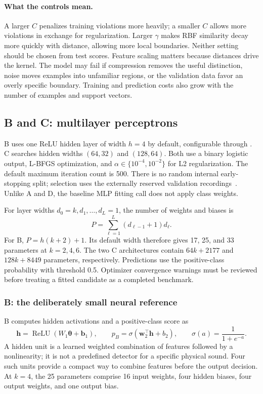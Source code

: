 \documentclass[11pt,letterpaper]{article}
\newcommand{\code}[1]{\texttt{\detokenize{#1}}}
\begin{document}
\paragraph{What the controls mean.}
A larger $C$ penalizes training violations more heavily; a smaller $C$ allows
more violations in exchange for regularization. Larger $\gamma$ makes RBF
similarity decay more quickly with distance, allowing more local boundaries.
Neither setting should be chosen from test scores. Feature scaling matters
because distances drive the kernel. The model may fail if compression removes
the useful distinction, noise moves examples into unfamiliar regions, or the
validation data favor an overly specific boundary. Training and prediction
costs also grow with the number of examples and support vectors.

\subsection{B and C: multilayer perceptrons}
B uses one ReLU hidden layer of width $h=4$ by default, configurable through
\code{--small-width}. C searches hidden widths $(64,32)$ and $(128,64)$.
Both use a binary logistic output, L-BFGS optimization, and
$\alpha\in\{10^{-4},10^{-2}\}$ for L2 regularization. The default maximum
iteration count is 500. There is no random internal early-stopping split;
selection uses the externally reserved validation recordings~\cite{mlp}.
Unlike A and D, the baseline MLP fitting call does not apply class weights.

For layer widths $d_0=k,d_1,\ldots,d_L=1$, the number of weights and biases is
\begin{equation}
 P=\sum_{\ell=1}^{L}(d_{\ell-1}+1)d_\ell.
\end{equation}
For B, $P=h(k+2)+1$. Its default width therefore gives 17, 25, and 33 parameters
at $k=2,4,6$. The two C architectures contain $64k+2177$ and $128k+8449$
parameters, respectively. Predictions use the positive-class probability with
threshold 0.5. Optimizer convergence warnings must be reviewed before treating
a fitted candidate as a completed benchmark.

\subsubsection{B: the deliberately small neural reference}
B computes hidden activations and a positive-class score as
\begin{equation}
 \mathbf{h}=\operatorname{ReLU}(W_1\boldsymbol{\theta}+\mathbf{b}_1),
 \qquad p_B=\sigma(\mathbf{w}_2^\top\mathbf{h}+b_2),
 \qquad \sigma(a)=\frac{1}{1+e^{-a}}.
\end{equation}
A hidden unit is a learned weighted combination of features followed by a
nonlinearity; it is not a predefined detector for a specific physical sound.
Four such units provide a compact way to combine features before the output
decision. At $k=4$, the 25 parameters comprise 16 input weights, four hidden
biases, four output weights, and one output bias.
\end{document}
